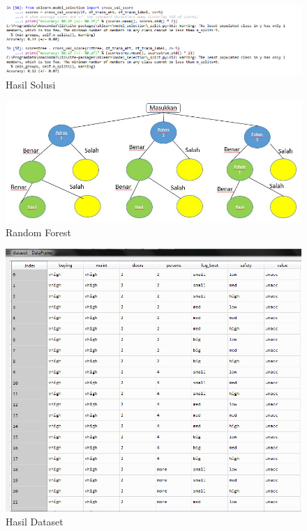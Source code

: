 \begin{figure}[ht]
      \centerline{\includegraphics[width=1\textwidth]
      {figures/cokro/c54}}
      \caption{Hasil Solusi}
      \label{c54}
      \end{figure}


\begin{figure}[ht]
	\centerline{\includegraphics[width=1\textwidth]{figures/huda/chapter3/1.JPG}}
	\caption{Random Forest}
	\label{h1}
\end{figure}

\begin{figure}[ht]
	\centerline{\includegraphics[width=1\textwidth]{figures/huda/chapter3/2.PNG}}
	\caption{Hasil Dataset}
	\label{h2}
\end{figure}

